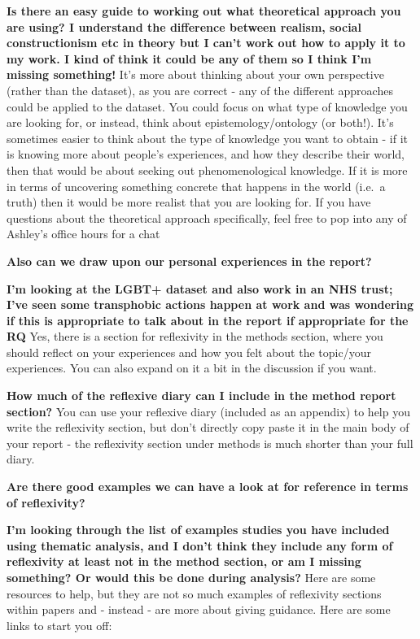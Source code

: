 \documentclass[
  english,
  letterpaper,
  DIV=11,
  numbers=noendperiod]{scrreprt}
\begin{document}
\textbf{Is there an easy guide to working out what theoretical approach
you are using? I understand the difference between realism, social
constructionism etc in theory but I can't work out how to apply it to my
work. I kind of think it could be any of them so I think I'm missing
something!} It's more about thinking about your own perspective (rather
than the dataset), as you are correct - any of the different approaches
could be applied to the dataset. You could focus on what type of
knowledge you are looking for, or instead, think about
epistemology/ontology (or both!). It's sometimes easier to think about
the type of knowledge you want to obtain - if it is knowing more about
people's experiences, and how they describe their world, then that would
be about seeking out phenomenological knowledge. If it is more in terms
of uncovering something concrete that happens in the world (i.e.~a
truth) then it would be more realist that you are looking for. If you
have questions about the theoretical approach specifically, feel free to
pop into any of Ashley's office hours for a chat

\textbf{Also can we draw upon our personal experiences in the report?}

\textbf{I'm looking at the LGBT+ dataset and also work in an NHS trust;
I've seen some transphobic actions happen at work and was wondering if
this is appropriate to talk about in the report if appropriate for the
RQ} Yes, there is a section for reflexivity in the methods section,
where you should reflect on your experiences and how you felt about the
topic/your experiences. You can also expand on it a bit in the
discussion if you want.

\textbf{How much of the reflexive diary can I include in the method
report section?} You can use your reflexive diary (included as an
appendix) to help you write the reflexivity section, but don't directly
copy paste it in the main body of your report - the reflexivity section
under methods is much shorter than your full diary.

\textbf{Are there good examples we can have a look at for reference in
terms of reflexivity?}

\textbf{I'm looking through the list of examples studies you have
included using thematic analysis, and I don't think they include any
form of reflexivity at least not in the method section, or am I missing
something? Or would this be done during analysis?} Here are some
resources to help, but they are not so much examples of reflexivity
sections within papers and - instead - are more about giving guidance.
Here are some links to start you off:
\end{document}
